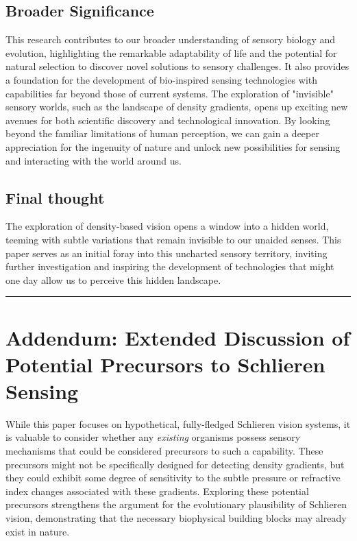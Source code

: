 \documentclass[11pt]{article}
\begin{document}
\subsection{Broader Significance}

This research contributes to our broader understanding of sensory biology and evolution, highlighting the remarkable adaptability of life and the potential for natural selection to discover novel solutions to sensory challenges. It also provides a foundation for the development of bio-inspired sensing technologies with capabilities far beyond those of current systems. The exploration of "invisible" sensory worlds, such as the landscape of density gradients, opens up exciting new avenues for both scientific discovery and technological innovation. By looking beyond the familiar limitations of human perception, we can gain a deeper appreciation for the ingenuity of nature and unlock new possibilities for sensing and interacting with the world around us.

\subsection{Final thought}
The exploration of density-based vision opens a window into a hidden world, teeming with subtle variations that remain invisible to our unaided senses. This paper serves as an initial foray into this uncharted sensory territory, inviting further investigation and inspiring the development of technologies that might one day allow us to perceive this hidden landscape.

\bigskip\noindent\rule{\linewidth}{0.4pt}\bigskip

\appendix
\section{Addendum: Extended Discussion of Potential Precursors to Schlieren Sensing}

While this paper focuses on hypothetical, fully-fledged Schlieren vision systems, it is valuable to consider whether any \textit{existing} organisms possess sensory mechanisms that could be considered precursors to such a capability. These precursors might not be specifically designed for detecting density gradients, but they could exhibit some degree of sensitivity to the subtle pressure or refractive index changes associated with these gradients. Exploring these potential precursors strengthens the argument for the evolutionary plausibility of Schlieren vision, demonstrating that the necessary biophysical building blocks may already exist in nature.
\end{document}
